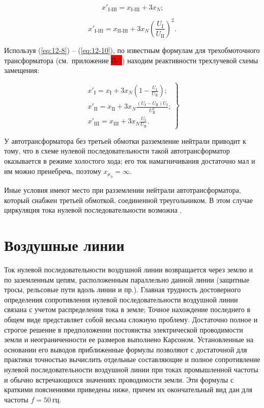 \begin{equation}
	x'_{\text{I-III}} = x_{\text{I-III}} + 3x_N \text{;}
	\label{eq:12-9}
\end{equation}

\begin{equation}
	x'_{\text{I-III}} = x_{\text{II-III}} + 3x_N \left (\frac{U_{\text{I}}}{U_{\text{II}}} \right )^2 \text{.}
	\label{eq:12-10}
\end{equation}

Используя (\ref{eq:12-8}) -- (\ref{eq:12-10}), по известным формулам для трехобмоточного трансформатора (см.~приложение \colorbox{red}{П-7}) находим реактивности трехлучевой схемы замещения:

\begin{equation}
	\left.\begin{matrix}
	x'_{\text{I}} = x_{\text{I}} + 3x_N \left ( 1- \frac{U_{\text{I}}}{U_{\text{II}}} \right ) \text{;} \\[1em]
	x'_{\text{II}} = x_{\text{II}} + 3x_N \frac{(U_{\text{I}} - U_{\text{II}})U_{\text{I}}}{U_{\text{II}}^2} \text{;} \\[1em]
	x'_{\text{III}} = x_{\text{III}} + 3x_N \frac{U_{\text{I}}}{U_{\text{II}}} \text{.}
	\end{matrix}\right\}
	\label{eq:12-11}
\end{equation}

У автотрансформатора без третьей обмотки разземление нейтрали приводит к тому, что в схеме нулевой последовательности такой автотрансформатор оказывается в режиме холостого хода; его ток намагничивания достаточно мал и им можно пренебречь, поэтому $ x_{\mu_0} = \infty $.

Иные условия имеют место при разземлении нейтрали автотрансформатора, который снабжен третьей обмоткой, соединенной треугольником. В этом случае циркуляция тока нулевой последовательности возможна \cite{04Ulianov64}.

\section{Воздушные линии}
\label{sec:12-7}

Ток нулевой последовательности воздушной линии возвращается через землю и по заземленным цепям, расположенным параллельно данной линии (защитные тросы, рельсовые пути вдоль линии и пр.). Главная трудность достоверного определения сопротивления нулевой последовательности воздушной линии связана с учетом распределения тока в земле; Точное нахождение последнего в общем виде представляет собой весьма сложную проблему. Достаточно полное и строгое решение в предположении постоянства электрической проводимости земли и неограниченности ее размеров выполнено Карсоном. Установленные на основании его выводов приближенные формулы позволяют с достаточной для практики точностью вычислить отдельные составляющие и полное сопротивление нулевой последовательности воздушной линии при токах промышленной частоты и обычно встречающихся значениях проводимости земли. Эти формулы с краткими пояснениями приведены ниже, причем их окончательный вид дан для частоты $ f = 50~\text{гц} $.

